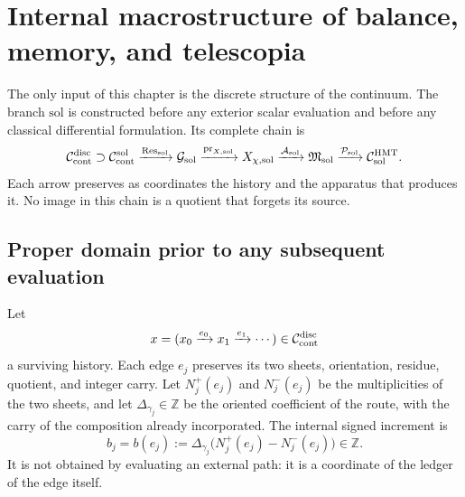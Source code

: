 \iffalse

\chapter{Internal macrostructure of balance, memory, and telescopia}
\label{chap:pdfv2-sol-interna}

\begin{statusbox}
The only input of this chapter is the discrete structure of the continuum.
The branch \(\mathrm{sol}\) is constructed before any exterior scalar evaluation
and before any classical differential formulation.  Its complete chain is
\[
 \mathcal C_{\rm cont}^{\rm disc}
 \supset\mathcal C_{\rm cont}^{\rm sol}
 \xrightarrow{\operatorname{Res}_{\rm sol}}
 \mathcal G_{\rm sol}
 \xrightarrow{\operatorname{pr}_{X,{\rm sol}}}
 X_{\chi,{\rm sol}}
 \xrightarrow{\mathcal A_{\rm sol}}
 \mathfrak M_{\rm sol}
 \xrightarrow{\mathcal P_{\rm sol}}
 \mathcal C_{\rm sol}^{\rm HMT}.
\]
Each arrow preserves as coordinates the history and the apparatus that
produces it.  No image in this chain is a quotient that forgets its source.
\end{statusbox}

\section{Proper domain prior to any subsequent evaluation}
\label{sec:pdfv2-sol-dominio}

Let
\[
 x=(x_0\xrightarrow{e_0}x_1\xrightarrow{e_1}\cdots)
 \in\mathcal C_{\rm cont}^{\rm disc}
\]
a surviving history.  Each edge \(e_j\) preserves its two sheets,
orientation, residue, quotient, and integer carry.  Let
\(N_j^+(e_j)\) and \(N_j^-(e_j)\) be the multiplicities of the two sheets, and let
\(\Delta_{\gamma_j}\in\mathbb Z\) be the oriented coefficient of the route, with the
carry of the composition already incorporated.  The internal signed increment is
\begin{equation}\label{eq:pdfv2-sol-b}
 b_j=b(e_j):=
 \Delta_{\gamma_j}\bigl(N_j^+(e_j)-N_j^-(e_j)\bigr)\in\mathbb Z.
\end{equation}
It is not obtained by evaluating an external path: it is a coordinate of the ledger of the edge itself.

